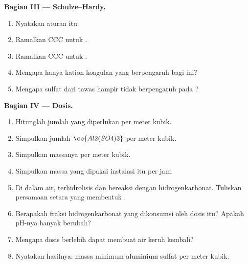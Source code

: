 \begin{problem}
\medskip\noindent\textbf{Bagian III --- Schulze--Hardy.}
\begin{enumerate}[resume, beginpenalty=10000]
  \item Nyatakan aturan itu.
  \item Ramalkan CCC untuk .
  \item Ramalkan CCC untuk .
  \item Mengapa hanya kation koagulan yang berpengaruh bagi  ini?
  \item Mengapa sulfat dari tawas hampir tidak berpengaruh pada ?
\end{enumerate}

\medskip\noindent\textbf{Bagian IV --- Dosis.}
\begin{enumerate}[resume, beginpenalty=10000]
  \item Hitunglah jumlah  yang diperlukan per meter kubik.
  \item Simpulkan jumlah $\ce{Al2(SO4)3}$ per meter kubik.
  \item Simpulkan massanya per meter kubik.
  \item Simpulkan massa yang dipakai instalasi itu per jam.
  \item Di dalam air,  terhidrolisis dan bereaksi dengan hidrogenkarbonat. Tuliskan
        persamaan setara yang membentuk .
  \item Berapakah fraksi hidrogenkarbonat yang dikonsumsi oleh dosis itu? Apakah
        pH-nya banyak berubah?
  \item Mengapa dosis berlebih dapat membuat air keruh kembali?
  \item Nyatakan hasilnya: massa minimum aluminium sulfat per meter kubik.
\end{enumerate}
\end{problem}
